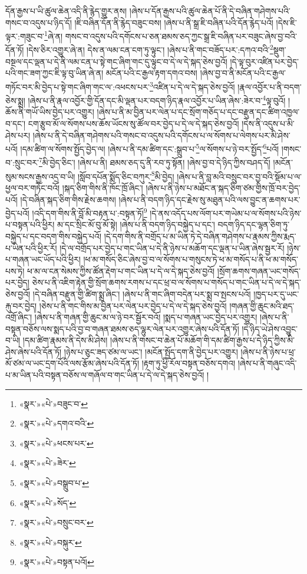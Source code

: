 དོན་རྒྱས་པ་ཡི་ཚུལ་ཆེན་འདི་ནི་རྙེད་གྱུར་ནས། །ཞེས་པ་དོན་རྒྱས་པའི་ཚུལ་ཆེན་པོ་ནི་དེ་བཞིན་གཤེགས་པའི་གསང་བ་འདུས་པ་ཉིད་དོ། །ཇི་བཞིན་དོན་ནི་རྙེད་བཟུང་བས། །ཞེས་པ་ནི་སྒྲ་ཇི་བཞིན་པའི་དོན་རྙེད་པའོ། །དེས་ཇི་ལྟར་:གཟུང་བ་\footnote{«སྣར་»«པེ་»བཟུང་བ་}ཞེ་ན། གསང་བ་འདུས་པའི་དགོངས་པ་ཅན་ཐམས་ཅད་ཀྱང་སྒྲ་ཇི་བཞིན་པར་བཟུང་ཞེས་བྱ་བའི་དོན་ཏོ། །དེས་ཅིར་འགྱུར་ཞེ་ན། དེས་ན་ལམ་ངན་ངག་ཏུ་ལྟུང་། །ཞེས་པ་ནི་གང་བཟོད་པར་:དཀའ་བའི་\footnote{«སྣར་»«པེ་»དགའ་བའི་}སྡུག་བསྔལ་དང་ལྡན་པ་དེ་ནི་ལམ་ངན་པ་སྟེ་གང་ཞིག་གང་དུ་ལྟུང་བ་དེ་ལ་དེ་སྐད་ཅེས་བྱའོ། །དེ་ལྟ་བུར་འཛིན་པར་བྱེད་པའི་གང་ཟག་ཀྱང་ཇི་ལྟ་བུ་ཡིན་ཞེ་ན། མངོན་པའི་ང་རྒྱལ་རྟག་དགའ་བས། །ཞེས་བྱ་བ་ནི་མངོན་པའི་ང་རྒྱལ་གཏོང་བར་མི་བྱེད་པ་སྟེ་གང་ཞིག་གང་ལ་:འཕངས་པར་\footnote{«སྣར་»«པེ་»ཕངས་པར་}འཛིན་པ་དེ་ལ་དེ་སྐད་ཅེས་བྱའོ། །རྣལ་འབྱོར་པ་ནི་བདག་ཅེས་སྨྲ། །ཞེས་པ་ནི་རྣལ་འབྱོར་གྱི་དོན་དང་མི་ལྡན་པར་བདག་ཉིད་རྣལ་འབྱོར་པ་ཡིན་ཞེས་:ཟེར་བ་\footnote{«སྣར་»«པེ་»ཟེར་}ལྟ་བུའོ། །ཆོས་ནི་གཡོ་ཡིས་བྱེད་པར་འགྱུར། །ཞེས་པ་ནི་མ་བྱིན་པར་ལེན་པ་དང་སྲོག་གཅོད་པ་དང་བརྫུན་དང་ཚིག་འཁྱལ་བ་དང་། ངག་རྩུབ་མོ་ལ་སོགས་པས་ཆོས་ཡོངས་སུ་ཚོལ་བར་བྱེད་པ་དེ་ལ་དེ་སྐད་ཅེས་བྱའོ། །དེས་ནི་འདུས་པ་མི་ཤེས་པར། །ཞེས་པ་ནི་དེ་བཞིན་གཤེགས་པའི་གསང་བ་འདུས་པའི་དགོངས་པ་ལ་སོགས་པ་ལེགས་པར་མི་ཤེས་པའོ། །དམ་ཚིག་ལ་སོགས་སྤྱོད་བྱེད་ལ། །ཞེས་པ་ནི་དམ་ཚིག་དང་:སྒྲུབ་པ་\footnote{«སྣར་»«པེ་»བསྒྲུབ་པ་}ལ་སོགས་པ་ཉེ་བར་སྤྱོད་\footnote{«སྣར་»«པེ་»སོད་}པའོ། །གསང་བ་:སྲུང་བར་\footnote{«སྣར་»«པེ་»བསྲུང་བར་}མི་བྱེད་ཅིང་། །ཞེས་པ་ནི། ཐམས་ཅད་དུ་ནི་རབ་ཏུ་སྟོན། །ཞེས་བྱ་བ་དེ་ཉིད་ཀྱིས་བཤད་དོ། །མངོན་སུམ་སངས་རྒྱས་འདྲ་བ་ཡི། །སློབ་དཔོན་སྨོད་ཅིང་བཀུར་\footnote{«སྣར་»«པེ་»བསྐུར་}མི་བྱེད། །ཞེས་པ་ནི་བླ་མའི་བསྲུང་བར་བྱ་བའི་སྡོམ་པ་ལ་ཕྱལ་བར་གཏོང་བའོ། །སྐད་ཅིག་གིས་ནི་ཁོང་ཁྲོ་ཞིང་། །ཞེས་པ་ནི་ཉེས་པ་མཐོང་ན་སྐད་ཅིག་ཙམ་གྱིས་ཁྲོ་བར་བྱེད་པའོ། །དེ་བཞིན་སྐད་ཅིག་གིས་རྗེས་ཆགས། །ཞེས་པ་ནི་བདག་ཉིད་དང་རྗེས་སུ་མཐུན་པའི་ལས་བྱུང་ན་ཆགས་པར་བྱེད་པའོ། །འདི་དག་གིས་ནི་བློ་མི་བརྟན་པ་:བསྟན་ཏོ།\footnote{«སྣར་»«པེ་»བསྟན་པའོ།} །དེ་ནས་འདོད་པས་ལོག་པར་གཡེམ་པ་ལ་སོགས་པའི་ཉེས་པ་བསྟན་པའི་ཕྱིར། མ་དང་སྲིང་མོ་བུ་མོ་སྟེ། །ཞེས་པ་ནི་བདག་ཉིད་བསྐྱེད་པ་དང་། བདག་ཉིད་དང་ལྷན་ཅིག་ཏུ་བསྐྱེད་པ་དང་བདག་གིས་བསྐྱེད་པའོ། །དེ་དག་གིས་ནི་བགྲོད་པ་མ་ཡིན་ཏེ་དེ་བཞིན་གཤེགས་པ་རྣམས་ཀྱིས་རྨད་པ་ཡིན་པའི་ཕྱིར་རོ། །དེ་ལ་བགྲོད་པར་བྱེད་པ་གང་ཡིན་པ་དེ་ནི་ཉེས་པ་མཆོག་དང་ལྡན་པ་ཡིན་ཞེས་སྦྱར་རོ། །ཉེས་པ་གཞན་ཡང་ཡོད་པའི་ཕྱིར། །ཕ་མ་གསོད་ཅིང་ཞེས་བྱ་བ་ལ་སོགས་པ་གསུངས་ཏེ་ཕ་མ་གསོད་པ་ནི་ཕ་མ་གསོད་པས་ཏེ། ཕ་མ་ལ་ངན་སེམས་ཀྱིས་ཚོན་རྡེག་པ་གང་ཡིན་པ་དེ་ལ་དེ་སྐད་ཅེས་བྱའོ། །སྲོག་ཆགས་གཞན་ཡང་གསོད་པར་བྱེད། ཅེས་པ་ནི་འཇིག་རྟེན་གྱི་སྲོག་ཆགས་རགས་པ་དང་ཕྲ་བ་ལ་སོགས་པ་གསོད་པ་གང་ཡིན་པ་དེ་ལ་དེ་སྐད་ཅེས་བྱའོ། །དེ་བཞིན་བརྫུན་གྱི་ཚིག་སྨྲ་ཞིང་། །ཞེས་པ་ནི་གང་ཞིག་བདེན་པར་སྨྲ་བ་སྤངས་པའོ། །ཁྱད་པར་དུ་ཡང་རྐུ་བར་བྱེད། །ཅེས་པ་ནི་གང་གིས་མ་བྱིན་པར་ལེན་པར་བྱེད་པ་དེ་ལ་དེ་སྐད་ཅེས་བྱའོ། །གཞན་གྱི་ཆུང་མའི་ཐད་འགྲོ་ཞིང་། །ཞེས་པ་ནི་གཞན་གྱི་ཆུང་མ་ལ་ཉེ་བར་སྦྱོར་བའོ། །སྨད་པ་གཞན་ཡང་བྱེད་པར་འགྱུར། །ཞེས་པ་ནི་བསྟན་བཅོས་ལས་སྨད་པའི་བྱ་བ་གཞན་ཐམས་ཅད་ལྷུར་ལེན་པར་འགྱུར་ཞེས་པའི་དོན་ཏོ། །དེ་ཉིད་ཡེ་ཤེས་འབྱུང་བ་ཡི། །དམ་ཚིག་རྣམས་ནི་དེས་མི་ཤེས། །ཞེས་པ་ནི་གསང་བ་ཆེན་པོ་མཆོག་གི་དམ་ཚིག་རྒྱས་པ་དེ་ཉིད་ཀྱིས་མི་ཤེས་ཞེས་པའི་དོན་ཏོ། །ཉེས་པ་ཅུང་ཟད་ཙམ་ལ་ཡང་། །མངོན་སྤྱོད་དག་ནི་བྱེད་པར་འགྱུར། །ཞེས་པ་ནི་ཉེས་པ་ཕྲ་མོ་ཙམ་ལ་ཡང་དྲག་པོའི་ལས་རྩོམ་ཞེས་པའི་དོན་ཏོ། །རྟག་ཏུ་ཕྱི་རོལ་བསྟན་བཅོས་དགའ། །ཞེས་པ་ནི་གཞུང་འདི་པ་མ་ཡིན་པའི་བསྟན་བཅོས་ལ་གཞོལ་བ་གང་ཡིན་པ་དེ་ལ་དེ་སྐད་ཅེས་བྱའོ། །
